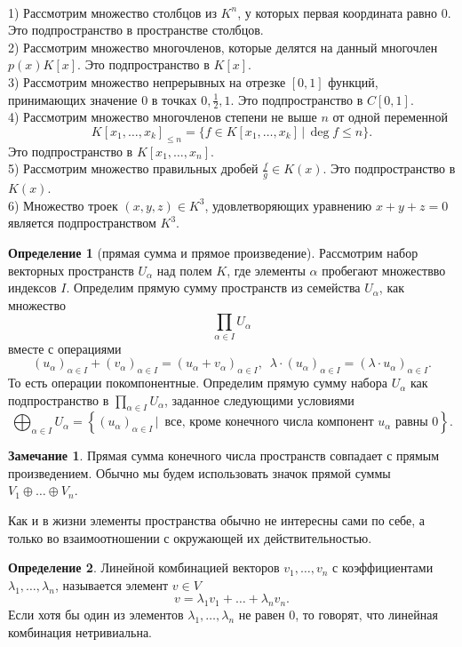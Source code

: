 \documentclass[10pt,a4paper,oneside]{book}
\theoremstyle{definition}
\newtheorem*{rem}{Замечание}
\newtheorem{defn}{Определение}
\def\exm{\noindent {\bf Примеры:}}
\def\dfn{\begin{defn}}
\def\edfn{\end{defn}}
\def\rm{\begin{rem}}
\def\erm{\end{rem}}
\begin{document}
\exm\\ 
1) Рассмотрим множество столбцов из $K^n$, у которых первая координата равно 0. Это подпространство в пространстве столбцов.\\
2) Рассмотрим множество многочленов, которые делятся на данный многочлен $p(x)K[x]$. Это подпространство в $K[x]$. \\
3) Рассмотрим множество непрерывных на отрезке $[0,1]$ функций, принимающих значение $0$  в точках $0, \frac{1}{2}, 1$. Это подпространство в $C[0,1]$.\\
4) Рассмотрим множество многочленов степени не выше $n$ от одной переменной $$K[x_1,\dots, x_k]_{\leq n}=\{ f \in K[x_1,\dots, x_k]\,|\, \deg f\leq n\}.$$ Это подпространство в  $K[x_1,\dots,x_n]$.\\
5) Рассмотрим множество правильных дробей $\frac{f}{g}\in K(x)$. Это подпространство в $K(x)$.\\
6) Множество троек $(x,y,z) \in K^3$, удовлетворяющих уравнению $x+y+z=0$ является подпространством $K^3$.\\


\dfn[прямая сумма и прямое произведение] Рассмотрим набор векторных пространств $U_{\alpha}$ над полем $K$,  где элементы $\alpha$ пробегают множествво индексов $I$. Определим прямую сумму пространств из семейства $U_{\alpha}$, как множество
$$\prod_{\alpha \in I} U_{\alpha}$$
вместе с операциями $$(u_{\alpha})_{\alpha\in I}+ (v_{\alpha})_{\alpha\in I}=(u_{\alpha}+v_{\alpha})_{\alpha\in I},\,\,\, \lambda \cdot (u_{\alpha})_{\alpha\in I}= (\lambda \cdot u_{\alpha})_{\alpha\in I}.$$
То есть операции покомпонентные. Определим прямую сумму набора $U_{\alpha}$ как подпространство в $\prod_{\alpha \in I} U_{\alpha}$, заданное следующими условиями
$$\bigoplus_{\alpha \in I } U_{\alpha}=\left\{ (u_{\alpha})_{\alpha \in I} \,|\, \text{ все, кроме конечного числа компонент $u_{\alpha}$ равны 0}\right\}.$$
\edfn

\rm Прямая сумма конечного числа пространств совпадает с прямым произведением. Обычно мы будем использовать значок прямой суммы $V_1\oplus \dots \oplus V_n$.
\erm


Как и в жизни элементы пространства обычно не интересны сами по себе, а только во взаимоотношении с окружающей их действительностью.

\dfn Линейной комбинацией векторов $v_1,\dots, v_n$ с коэффициентами $\lambda_1, \dots, \lambda_n$, называется элемент $v\in V$ 
$$v=\lambda_1 v_1 +\dots + \lambda_n v_n.$$
Если хотя бы один из элементов $\lambda_1,\dots, \lambda_n $ не равен 0, то говорят, что линейная комбинация нетривиальна.
\edfn
\end{document}
